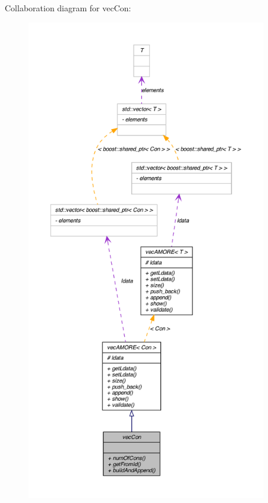 Collaboration diagram for vecCon:\nopagebreak
\begin{figure}[H]
\begin{center}
\leavevmode
\includegraphics[height=600pt]{classvec_con__coll__graph}
\end{center}
\end{figure}
